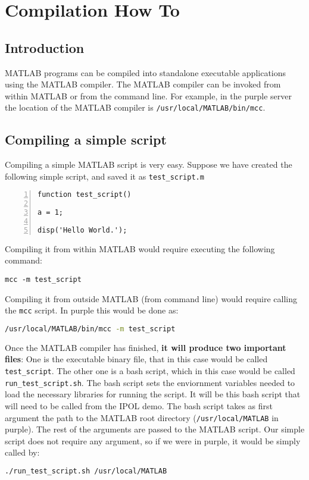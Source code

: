 \section{Compilation How To}
\subsection{Introduction}
MATLAB programs can be compiled into standalone executable applications using
the MATLAB compiler.  The MATLAB compiler can be invoked from within MATLAB or
from the command line. For example, in the purple server the location of the
MATLAB compiler is \texttt{/usr/local/MATLAB/bin/mcc}.

\subsection{Compiling a simple script}
Compiling a simple MATLAB script is very easy. Suppose we have created the
following simple script, and saved it as \texttt{test\_script.m}
\begin{lstlisting}[numbers=left,title={First version of \texttt{test\_script.m}},captionpos=b]
function test_script()

a = 1;

disp('Hello World.');
\end{lstlisting}

Compiling it from within MATLAB would require executing the following command:

\begin{lstlisting}
mcc -m test_script
\end{lstlisting}

Compiling it from outside MATLAB (from command line) would require calling the
\texttt{mcc} script. In purple this would be done as:

\begin{lstlisting}[language=bash]
/usr/local/MATLAB/bin/mcc -m test_script
\end{lstlisting}


Once the MATLAB compiler has finished, \textbf{it will produce two important
  files}: One is the executable binary file, that in this case would be called
\texttt{test\_script}. The other one is a bash script, which in this case would
be called \texttt{run\_test\_script.sh}. The bash script sets the enviornment
variables needed to load the necessary libraries for running the script. It will
be this bash script that will need to be called from the IPOL demo.  The bash
script takes as first argument the path to the MATLAB root directory
(\texttt{/usr/local/MATLAB} in purple). The rest of the arguments are passed to
the MATLAB script. Our simple script does not require any argument, so if we
were in purple, it would be simply called by:
\begin{lstlisting}[language=bash]
./run_test_script.sh /usr/local/MATLAB
\end{lstlisting}


